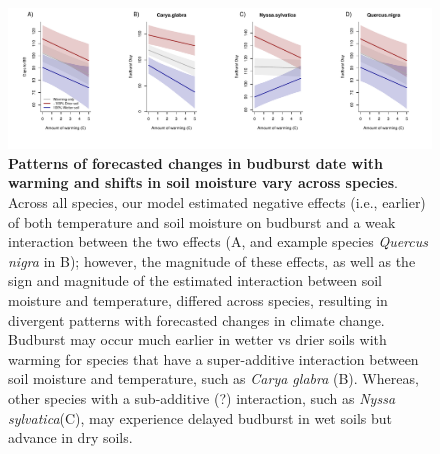 \documentclass{article}
\begin{document}
 
 \begin{figure}[h]
\centering
 \includegraphics{../../Analyses/soilmoisture/figures/tempforecast_bb_0_5_28_105_135_4_degwarm.pdf}
 
 \caption{\textbf{Patterns of forecasted changes in budburst date with warming and shifts in soil moisture vary across species}. Across all species, our model estimated negative effects (i.e., earlier) of both temperature and soil moisture on budburst and a weak interaction between the two effects (A, and example species  \textit{Quercus nigra} in B); however, the magnitude of these effects, as well as the sign and magnitude of the estimated interaction between soil moisture and temperature, differed across species, resulting in divergent patterns with forecasted changes in climate change.  Budburst may occur much earlier in wetter vs drier soils with warming for species that have a super-additive interaction between soil moisture and temperature, such as \textit{Carya glabra} (B). Whereas, other species with a sub-additive (?) interaction, such as \textit{Nyssa sylvatica}(C), may experience delayed budburst in wet soils but advance in dry soils.}
 \label{fig:bbsp}
 \end{figure}
 
\end{document}
